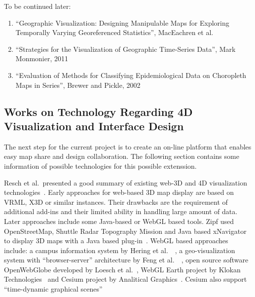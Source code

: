 \documentclass[hidelinks,12pt]{article}
\newcommand{\grey}[1]{\textcolor{black!30}{#1}}
\begin{document}
\begin{comment}
``Data Visualization with Spacetime Maps'', Richard L. Brownrigg, 2005
(read further later on)
\end{comment}

\grey{To be continued later:
\begin{enumerate}[label*=\arabic*.]
\item ``Geographic Visualization: Designing Manipulable Maps for
    Exploring Temporally Varying Georeferenced Statistics'', MacEachren et al.\
\item ``Strategies for the Visualization of Geographic Time-Series
    Data'', Mark Monmonier, 2011
\item ``Evaluation of Methods for Classifying Epidemiological Data
    on Choropleth Maps in Series'', Brewer and Pickle, 2002
\end{enumerate}}

\subsection{Works on Technology Regarding 4D Visualization and
  Interface Design}
The next step for the current project is to create an on-line platform
that enables easy map share and design collaboration. The following
section contains some information of possible technologies for this
possible extenssion.

Resch et al.\ presented a good summary of existing web-3D and 4D
visualization technologies~\cite{Resch2014}. Early approaches for
web-based 3D map display are based on VRML, X3D or similar
instances. Their drawbacks are the requirement of additional add-ins
and their limited ability in handling large amount of data. Later
approaches include some Java-based or WebGL based tools. Zipf used
OpenStreetMap, Shuttle Radar Topography Mission and Java based
xNavigator to display 3D maps with a Java based
plug-in~\cite{Zipf2014}. WebGL based approaches include: a campus
information system by Hering et al.\ ~\cite{Hering2011}, a
geo-visualization system with ``browser-server'' architecture by Feng
et al.\ ~\cite{Feng2011}, open source software OpenWebGlobe developed
by Loesch et al.\ , WebGL Earth project by Klokan
Technologies~\cite{KlokanTechnologies2015} and Cesium project by
Analitical Graphics~\cite{AGI2015}. Cesium also support ``time-dynamic
graphical scenes''~\cite{CZML2015}
\end{document}
